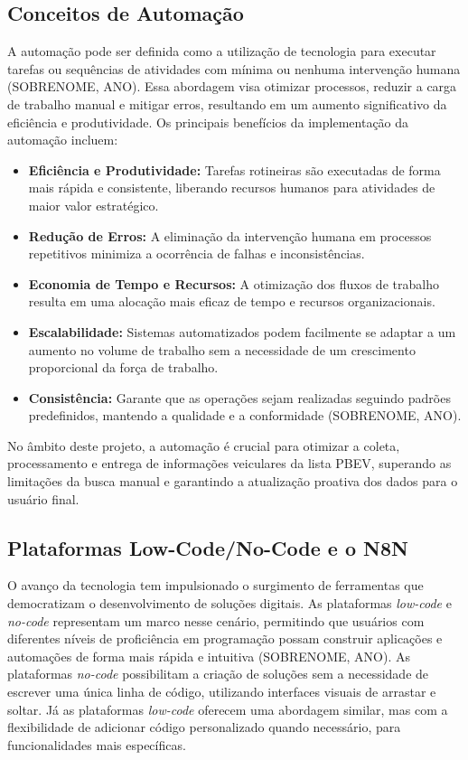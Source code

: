 \subsection{Conceitos de Automação}
A automação pode ser definida como a utilização de tecnologia para executar tarefas ou sequências de atividades com mínima ou nenhuma intervenção humana (SOBRENOME, ANO). Essa abordagem visa otimizar processos, reduzir a carga de trabalho manual e mitigar erros, resultando em um aumento significativo da eficiência e produtividade. Os principais benefícios da implementação da automação incluem:
\begin{itemize}
    \item \textbf{Eficiência e Produtividade:} Tarefas rotineiras são executadas de forma mais rápida e consistente, liberando recursos humanos para atividades de maior valor estratégico.
    \item \textbf{Redução de Erros:} A eliminação da intervenção humana em processos repetitivos minimiza a ocorrência de falhas e inconsistências.
    \item \textbf{Economia de Tempo e Recursos:} A otimização dos fluxos de trabalho resulta em uma alocação mais eficaz de tempo e recursos organizacionais.
    \item \textbf{Escalabilidade:} Sistemas automatizados podem facilmente se adaptar a um aumento no volume de trabalho sem a necessidade de um crescimento proporcional da força de trabalho.
    \item \textbf{Consistência:} Garante que as operações sejam realizadas seguindo padrões predefinidos, mantendo a qualidade e a conformidade (SOBRENOME, ANO).
\end{itemize}
No âmbito deste projeto, a automação é crucial para otimizar a coleta, processamento e entrega de informações veiculares da lista PBEV, superando as limitações da busca manual e garantindo a atualização proativa dos dados para o usuário final.

\subsection{Plataformas Low-Code/No-Code e o N8N}
O avanço da tecnologia tem impulsionado o surgimento de ferramentas que democratizam o desenvolvimento de soluções digitais. As plataformas \textit{low-code} e \textit{no-code} representam um marco nesse cenário, permitindo que usuários com diferentes níveis de proficiência em programação possam construir aplicações e automações de forma mais rápida e intuitiva (SOBRENOME, ANO). As plataformas \textit{no-code} possibilitam a criação de soluções sem a necessidade de escrever uma única linha de código, utilizando interfaces visuais de arrastar e soltar. Já as plataformas \textit{low-code} oferecem uma abordagem similar, mas com a flexibilidade de adicionar código personalizado quando necessário, para funcionalidades mais específicas.

